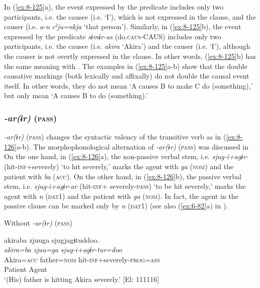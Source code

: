 In (\ref{ex:8-125}a), the event expressed by the predicate includes only two participants, i.e. the causee (i.e. ‘I’), which is not expressed in the clause, and the causer (i.e. \textit{a-n} \textit{cˀju=nkja} ‘that person’). Similarly, in (\ref{ex:8-125}b), the event expressed by the predicate \textit{sɨmɨr-as} (do.\textsc{caus}-CAUS) includes only two participants, i.e. the causee (i.e. \textit{akira} ‘Akira’) and the causer (i.e. ‘I’), although the causer is not overtly expressed in the clause. In other words, (\ref{ex:8-125}b) has the same meaning with . The examples in (\ref{ex:8-125}a-b) show that the double causative markings (both lexically and affixally) do not double the causal event itself. In other words, they do not mean ‘A causes B to make C do (something),’ but only mean ‘A causes B to do (something).’

\subsubsection{\textit{-ar(ɨr)} (\textsc{pass})}

\textit{-ar(ɨr)} (\textsc{pass}) changes the syntactic valency of the transitive verb as in (\ref{ex:8-126}a-b). The morphophonological alternation of \textit{-ar(ɨr)} (\textsc{pass}) was discussed in  On the one hand, in (\ref{ex:8-126}a), the non-passive verbal stem, i.e. \textit{sjug-i+agɨr-} (hit-\textsc{inf}+severely) ‘to hit severely,’ marks the agent with \textit{ga} (\textsc{nom}) and the patient with \textit{ba} (\textsc{acc}). On the other hand, in (\ref{ex:8-126}b), the passive verbal stem, i.e. \textit{sjug-i+agɨr-ar} (hit-\textsc{inf}+ severely-\textsc{pass}) ‘to be hit severely,’ marks the agent with \textit{n} (\textsc{dat1}) and the patient with \textit{ga} (\textsc{nom}). In fact, the agent in the passive clause can be marked only by \textit{n} (\textsc{dat1}) (see also (\ref{ex:6-82}a) in ).

\ea\label{ex:8-126}
\ea Without \textit{-ar(ɨr)} (\textsc{pass})

{\TM}
\glll  akiraba  zjuuga  sjugjagɨtuddoo.\\
\textit{akira=ba}  \textit{zjuu=ga}  \textit{sjug-i+agɨr-tur=doo}\\
Akira=\textsc{acc}  father=\textsc{nom}  hit-\textsc{inf}+severely-\textsc{prog}=\textsc{ass}\\
      Patient  Agent  \\
\glt ‘(His) father is hitting Akira severely.’ [El: 111116]


